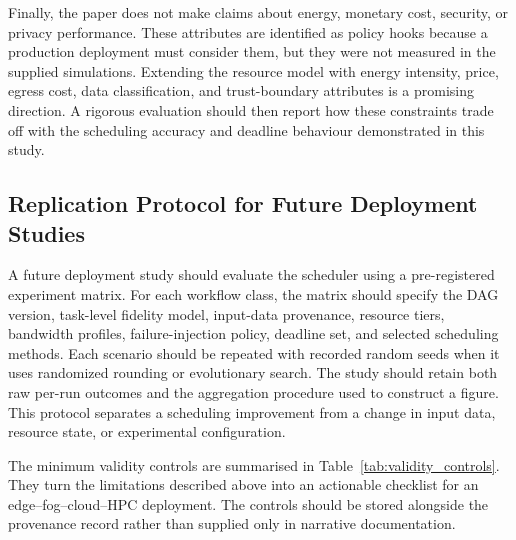 Finally, the paper does not make  claims about energy, monetary cost, security, or privacy performance. These attributes are identified as policy hooks because a production deployment must consider them, but they were not measured in the supplied simulations. Extending the resource model with energy intensity, price, egress cost, data classification, and trust-boundary attributes is a promising direction. A rigorous evaluation should then report how these constraints trade off with the scheduling accuracy and deadline behaviour demonstrated in this study.


\subsection{Replication Protocol for Future Deployment Studies}

A future deployment study should evaluate the scheduler using a pre-registered experiment matrix. For each workflow class, the matrix should specify the DAG version, task-level fidelity model, input-data provenance, resource tiers, bandwidth profiles, failure-injection policy, deadline set, and selected scheduling methods. Each scenario should be repeated with recorded random seeds when it uses randomized rounding or evolutionary search. The study should retain both raw per-run outcomes and the aggregation procedure used to construct a figure. This protocol separates a scheduling improvement from a change in input data, resource state, or experimental configuration.

The minimum validity controls are summarised in Table~\ref{tab:validity_controls}. They turn the limitations described above into an actionable checklist for an edge--fog--cloud--HPC deployment. The controls should be stored alongside the provenance record rather than supplied only in narrative documentation.

